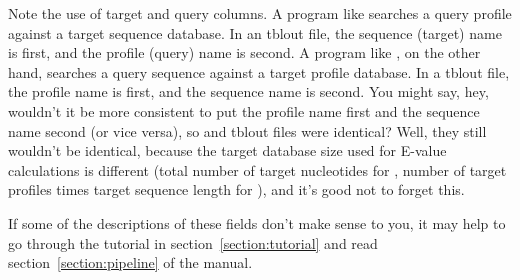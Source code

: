 Note the use of target and query columns. A program like
 searches a query profile against a target sequence
database. In an  tblout file, the sequence (target)
name is first, and the profile (query) name is second. A program like
, on the other hand, searches a query sequence against a
target profile database. In a  tblout file, the profile
name is first, and the sequence name is second. You might say, hey,
wouldn't it be more consistent to put the profile name first and the
sequence name second (or vice versa), so  and
 tblout files were identical? Well, they
still wouldn't be identical, because the target database size used for
E-value calculations is different (total number of target nucleotides
for , number of target profiles times target sequence
length for ), and it's good not to forget this.

If some of the descriptions of these fields don't make sense to you,
it may help to go through the tutorial in
section~\ref{section:tutorial} and read section~\ref{section:pipeline}
of the manual. 


